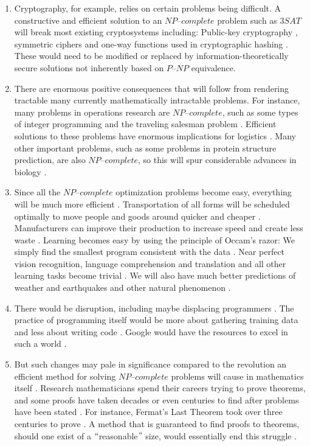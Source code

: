 \documentclass[a4paper,UKenglish,cleveref, autoref]{lipics-v2019}
\begin{document}
\begin{enumerate}
\item Cryptography, for example, relies on certain problems being difficult. A constructive and efficient solution to an $\textit{NP--complete}$ problem such as $3SAT$ will break most existing cryptosystems including: Public-key cryptography \cite{HW97}, symmetric ciphers \cite{MM00} and one-way functions used in cryptographic hashing \cite{DKV07}. These would need to be modified or replaced by information-theoretically secure solutions not inherently based on $\textit{P--NP}$ equivalence.
\item There are enormous positive consequences that will follow from rendering tractable many currently mathematically intractable problems. For instance, many problems in operations research are $\textit{NP--complete}$, such as some types of integer programming and the traveling salesman problem \cite{GJ79}. Efficient solutions to these problems have enormous implications for logistics \cite{CS00}. Many other important problems, such as some problems in protein structure prediction, are also $\textit{NP--complete}$, so this will spur considerable advances in biology \cite{BL98}.
\item Since all the $\textit{NP--complete}$ optimization problems become easy, everything will be much more efficient \cite{LF09}. Transportation of all forms will be scheduled optimally to move people and goods around quicker and cheaper \cite{LF09}. Manufacturers can improve their production to increase speed and create less waste \cite{LF09}. Learning becomes easy by using the principle of Occam's razor: We simply find the smallest program consistent with the data \cite{LF09}. Near perfect vision recognition, language comprehension and translation and all other learning tasks become trivial \cite{LF09}. We will also have much better predictions of weather and earthquakes and other natural phenomenon \cite{LF09}.
\item There would be disruption, including maybe displacing programmers \cite{IMP95}. The practice of programming itself would be more about gathering training data and less about writing code \cite{IMP95}. Google would have the resources to excel in such a world \cite{IMP95}.
\item But such changes may pale in significance compared to the revolution an efficient method for solving $\textit{NP--complete}$ problems will cause in mathematics itself \cite{CS00}. Research mathematicians spend their careers trying to prove theorems, and some proofs have taken decades or even centuries to find after problems have been stated \cite{AS17}. For instance, Fermat's Last Theorem took over three centuries to prove \cite{AS17}. A method that is guaranteed to find proofs to theorems, should one exist of a $``$reasonable$"$ size, would essentially end this struggle \cite{CS00}.
\end{enumerate}


\end{document}
